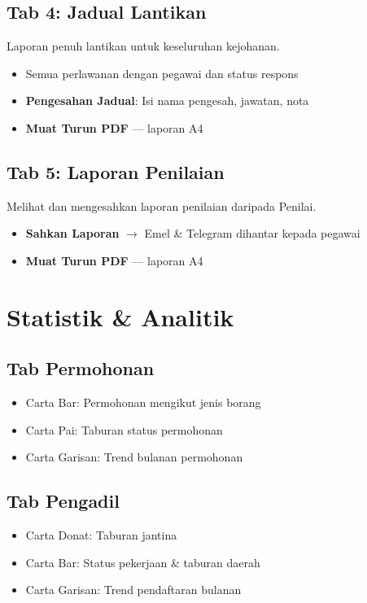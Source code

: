 \documentclass[12pt,a4paper]{report}
\begin{document}
\subsection{Tab 4: Jadual Lantikan}

Laporan penuh lantikan untuk keseluruhan kejohanan.

\begin{itemize}[label=\textcolor{pbnpblue}{\faChevronRight}]
  \item Semua perlawanan dengan pegawai dan status respons
  \item \textbf{Pengesahan Jadual}: Isi nama pengesah, jawatan, nota
  \item \textbf{Muat Turun PDF} --- laporan A4
\end{itemize}

\subsection{Tab 5: Laporan Penilaian}

Melihat dan mengesahkan laporan penilaian daripada Penilai.

\begin{itemize}[label=\textcolor{pbnpblue}{\faChevronRight}]
  \item \textbf{Sahkan Laporan} $\rightarrow$ Emel \& Telegram dihantar kepada pegawai
  \item \textbf{Muat Turun PDF} --- laporan A4
\end{itemize}

\section{Statistik \& Analitik}

\subsection{Tab Permohonan}
\begin{itemize}[label=\textcolor{pbnpblue}{\faChevronRight}, nosep]
  \item Carta Bar: Permohonan mengikut jenis borang
  \item Carta Pai: Taburan status permohonan
  \item Carta Garisan: Trend bulanan permohonan
\end{itemize}

\subsection{Tab Pengadil}
\begin{itemize}[label=\textcolor{pbnpblue}{\faChevronRight}, nosep]
  \item Carta Donat: Taburan jantina
  \item Carta Bar: Status pekerjaan \& taburan daerah
  \item Carta Garisan: Trend pendaftaran bulanan
\end{itemize}
\end{document}
